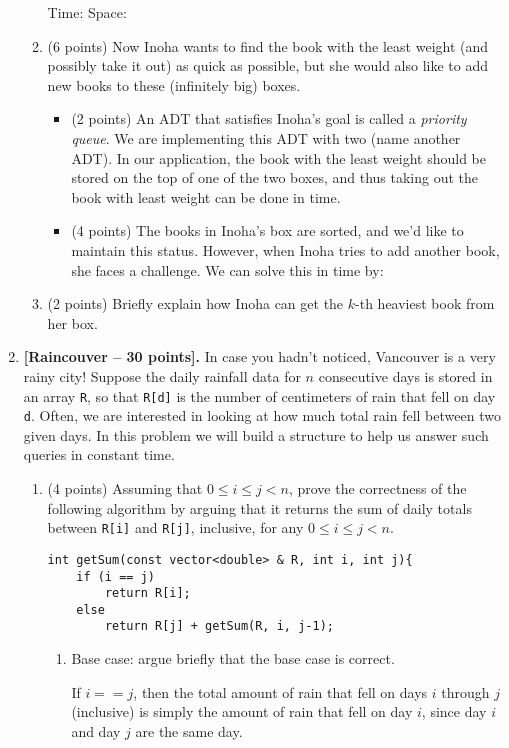 \documentclass[11pt]{article}
\newcommand{\fillinblank}[1]{\fillinblankmath{\mbox{#1}}}
\newcommand{\fillinlarge}[1]{\fbox{\LARGE{\textbf{#1}}}}
\newcommand{\fillinsmall}[1]{\fbox{\text{#1}}}
\newcommand{\fillinblankmath}[1]{\begingroup\setlength{\fboxsep}{1em}\setlength{\fboxrule}{2pt}\fbox{\LARGE\phantom{#1}}\endgroup}
\def\problem#1{\def\problemheading{#1}\clearpage\item{\bf #1.}}
\begin{document}
\begin{enumerate}
\begin{enumerate}
Time: \fillinblank{MMMMM} Space: \fillinblank{MMMMM}
\vspace{2in}
\newpage

\item (6 points) Now Inoha wants to find the book with the least weight (and possibly take it out) as quick as possible, but she would also like to add new books to these (infinitely big) boxes. 
\begin{itemize}
\item (2 points) An ADT that satisfies Inoha's goal is called a {\em priority queue}. We are implementing this ADT with two (name another ADT)\fillinsmall{stacks}. In our application, the book with the least weight should be stored on the top of one of the two boxes, and thus taking out the book with least weight can be done in \fillinlarge{O(1)} time. 
\item (4 points) The books in Inoha's box are sorted, and we'd like to maintain this status. However, when Inoha tries to add another book, she faces a challenge. We can solve this in \fillinblank{mmmmm} time by:  
\vspace{2in}
\end{itemize}

\item (2 points) Briefly explain how Inoha can get the $k$-th heaviest book from her box.
\end{enumerate}
\newpage

\problem{[Raincouver -- 30 points]}
In case you hadn't noticed, Vancouver is a very rainy city! Suppose the daily rainfall data for $n$ consecutive days is stored in an array {\tt R}, so that {\tt R[d]} is the number of centimeters of rain that fell on day {\tt d}. Often, we are interested in looking at how much total rain fell between two given days. In this problem we will build a structure to help us answer such queries in constant time. 
\begin{enumerate}

\item (4 points) Assuming that $0 \leq i \leq j< n$, prove the correctness of the following algorithm by arguing that it returns the sum of daily totals between {\tt R[i]} and {\tt R[j]}, inclusive, for any $0 \leq i \leq j< n$.

\begin{lstlisting}
int getSum(const vector<double> & R, int i, int j){
	if (i == j)
		return R[i];
	else
		return R[j] + getSum(R, i, j-1);
\end{lstlisting}
\begin{enumerate}
	\item Base case: argue briefly that the base case is correct.\\ 
\begin{framed}
    If $i == j$, then the total amount of rain that fell on days $i$ through $j$  (inclusive) is simply the amount of rain that fell on day $i$, since day $i$ and day $j$ are the same day.
\end{framed}
    

\end{enumerate}
\end{enumerate}
\end{enumerate}
\end{document}

